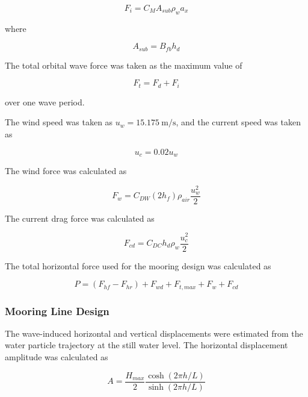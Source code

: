 \documentclass[a4paper, 11pt]{article}
\begin{document}
\begin{equation}
    F_i=C_M A_{sub}\rho_w a_x
\end{equation}

where

\begin{equation}
    A_{sub}=B_{fb}h_d
\end{equation}

The total orbital wave force was taken as the maximum value of

\begin{equation}
    F_t=F_d+F_i
\end{equation}

over one wave period.

The wind speed was taken as \(u_w=15.175~\mathrm{m/s}\), and the current speed was taken as

\begin{equation}
    u_c=0.02u_w
\end{equation}

The wind force was calculated as

\begin{equation}
    F_w=C_{DW}(2h_f)\rho_{air}\frac{u_w^2}{2}
\end{equation}

The current drag force was calculated as

\begin{equation}
    F_{cd}=C_{DC}h_d\rho_w\frac{u_c^2}{2}
\end{equation}

The total horizontal force used for the mooring design was calculated as

\begin{equation}
    P=(F_{hf}-F_{hr})+F_{wd}+F_{t,max}+F_w+F_{cd}
\end{equation}

\subsubsection{Mooring Line Design}

\hspace*{0.5cm} The wave-induced horizontal and vertical displacements were estimated from the water particle trajectory at the still water level. The horizontal displacement amplitude was calculated as

\begin{equation}
    A=
    \frac{H_{max}}{2}
    \frac{\cosh(2\pi h/L)}{\sinh(2\pi h/L)}
\end{equation}
\end{document}
